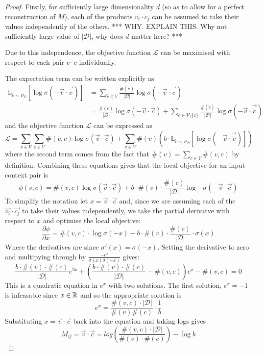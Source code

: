 \documentclass[a4paper]{article}
\renewcommand{\E}{\mathbb E}
\newcommand{\D}{\mathcal D}
\begin{document}
\begin{proof}
  Firstly, for sufficiently large dimensionality $d$ (so as to allow for a perfect
  reconstruction of $M$), each of the products $v_i \cdot c_j$ can be assumed to
  take their values independently of the others.
  *** WHY. EXPLAIN THIS. Why not sufficiently large value of $|\D|$, why does $d$
  matter here? ***

  Due to this independence, the objective function $\mathcal{L}$ can be maximised with
  respect to each pair $v \cdot c$ individually.

  The expectation term can be written explicitly as
  \begin{align*}
    \E_{\tilde{c} \sim P_{\D}}[\log{\sigma(-\vec{v} \cdot \vec{\tilde{c}})}] &= \sum_{\tilde{c} \in V}{\frac{\#(\tilde{c})}{|\D|} \log{\sigma(-\vec{v} \cdot \vec{\tilde{c}})}}\\
                                                                             &= \frac{\#(c)}{|\D|} \log{\sigma(-\vec{v} \cdot \vec{c})} + \sum_{\tilde{c} \in V \setminus \{c\}}{\frac{\#(\tilde{c})}{|\D|} \log{\sigma(-\vec{v} \cdot \vec{\tilde{c}})}}
  \end{align*}
  and the objective function $\mathcal{L}$ can be expressed as
  \begin{equation*}
    \mathcal{L} =  \sum_{v \in V}\sum_{c \in V}\#(v, c)\log{\sigma(\vec{v} \cdot \vec{c})} + \sum_{v \in V}\#(v)\left(b \cdot \E_{\tilde{c} \sim P_{\D}}[\log{\sigma(-\vec{v} \cdot \vec{\tilde{c}})}] \right)
  \end{equation*}
  where the second term comes from the fact that $\#(v) = \sum_{c \in V}\#(v,c)$
  by definition. Combining these equations gives that the local objective for an input-context
  pair is
  \begin{equation*}
    \phi(v, c) = \#(v, c)\log{\sigma(\vec{v} \cdot \vec{c})} + b \cdot \#(v)\cdot \frac{\#(c)}{|\D|}\log{-\sigma(-\vec{v} \cdot \vec{c})} 
  \end{equation*}
  To simplify the notation let $x = \vec{v} \cdot \vec{c}$ and, since we are
  assuming each of the $\vec{v_i} \cdot \vec{c_j}$ to take their values
  independently, we take the partial derivatve with respect to $x$ and optimise
  the local objective:
  \[\frac{\partial{\phi}}{\partial{x}} = \#(v, c) \cdot \log{\sigma(-x)} - b \cdot
    \#(v) \cdot \frac{\#(c)}{|\D|} \cdot \sigma(x)\]
  Where the derivatives are since $\sigma'(x) = \sigma(-x)$. Setting
  the derivative to zero and multipying through by
  $\frac{-e^x}{\sigma(x)\sigma(-x)}$ gives:
  \[\frac{b \cdot \#(v) \cdot \#(c)}{|\D|}e^{2x} + \left( \frac{b \cdot \#(v)
        \cdot \#(c)}{|\D|} - \#(v, c) \right)e^x - \#(v, c) = 0\]
  This is a quadratic equation in $e^x$ with two solutions. The first solution,
  $e^x = -1$ is infeasable since $x \in \R$ and so the appropriate solution is
  \[e^x = \frac{\#(v,c) \cdot |\D|}{\#(v)\#(c)} \cdot \frac{1}{b}\]
  Substituting $x = \vec{v} \cdot \vec{c}$ back into the equation and taking
  logs gives
  \[M_{ij} = \vec{v} \cdot \vec{c} = log{\left( \frac{\#(v, c) \cdot |\D|}{\#(v) \cdot
          \#(c)} \right)} - \log{b}\]
\end{proof}
\end{document}
